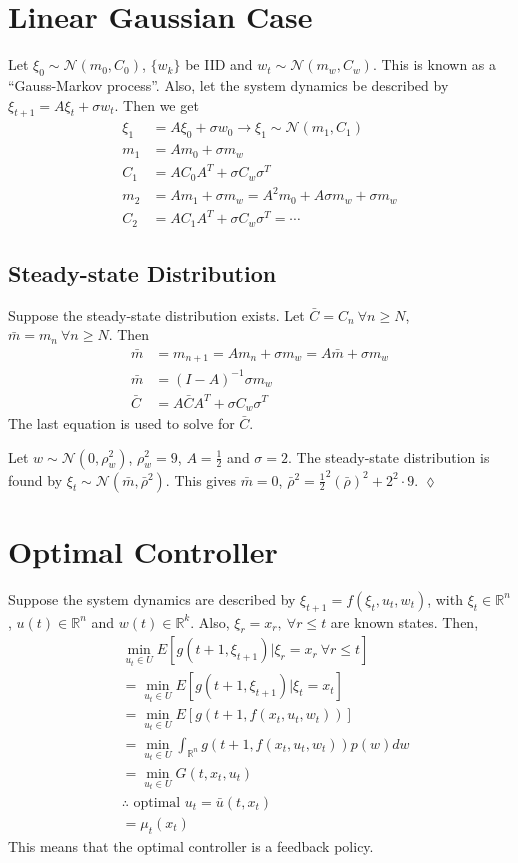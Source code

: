 \section{Linear Gaussian Case}
Let $\xi_0 \sim \mathcal{N}(m_0,C_0)$, $\{w_k\}$ be IID and $w_t \sim \mathcal{N}(m_w,C_w)$.
This is known as a ``Gauss-Markov process''.
Also, let the system dynamics be described by $\xi_{t+1}=A\xi_t+\sigma w_t$.
Then we get
\begin{align*}
\xi_1 &= A\xi_0+\sigma w_0 \rightarrow \xi_1 \sim \mathcal{N}(m_1,C_1) \\
m_1 &= Am_0+\sigma m_w \\
C_1 &= AC_0A^T + \sigma C_w\sigma^T \\
m_2 &= Am_1 + \sigma m_w = A^2m_0 + A\sigma m_w + \sigma m_w \\
C_2 &= AC_1A^T + \sigma C_w\sigma^T = \cdots
\end{align*}

\subsection{Steady-state Distribution}
Suppose the steady-state distribution exists.
Let $\bar{C} = C_n~\forall n\geq N$, $\bar{m} = m_n~\forall n\geq N$.
Then
\begin{align*}
\bar{m} &= m_{n+1} = Am_n + \sigma m_w = A\bar{m} + \sigma m_w \\
\bar{m} &= {(I-A)}^{-1}\sigma m_w \\
\bar{C} &= A\bar{C}A^T + \sigma C_w\sigma^T
\end{align*}
The last equation is used to solve for $\bar{C}$.

\begin{example}
Let $w\sim\mathcal{N}(0,\rho_w^2)$, $\rho_w^2=9$, $A=\frac{1}{2}$ and $\sigma=2$.
The steady-state distribution is found by $\xi_t \sim\mathcal{N}(\bar{m}, \bar{\rho}^2)$.
This gives $\bar{m}=0$, $\bar{\rho}^2 = \frac{1}{2}^2{(\bar{\rho})}^2 + 2^2\cdot 9$.
$\lozenge$
\end{example}

\section{Optimal Controller}
Suppose the system dynamics are described by $\xi_{t+1} = f(\xi_t,u_t,w_t)$, with $\xi_t\in\mathbb{R}^n$, $u(t)\in\mathbb{R}^n$ and $w(t)\in\mathbb{R}^k$.
Also, $\xi_r=x_r,~\forall r\leq t$ are known states.
Then,
\begin{align*}
&\min_{u_t\in U} E[g(t+1,\xi_{t+1}) | \xi_r=x_r~\forall r\leq t] \\
&= \min_{u_t\in U} E[g(t+1,\xi_{t+1}) | \xi_t=x_t] \\
&= \min_{u_t\in U} E[g(t+1, f(x_t,u_t,w_t))] \\
&= \min_{u_t\in U} \int_{\mathbb{R}^n} g(t+1,f(x_t,u_t,w_t))p(w)dw \\
&= \min_{u_t\in U} G(t,x_t,u_t) \\
&\therefore \text{~optimal~} u_t=\bar{u}(t,x_t) \\
&= \mu_t(x_t)
\end{align*}
This means that the optimal controller is a feedback policy.

